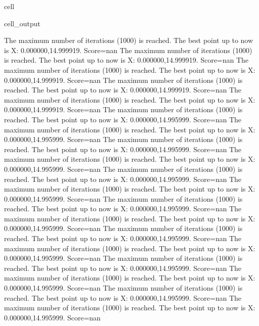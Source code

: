 \documentclass[letterpaper,10pt,english]{jupyterBook}
\begin{document}
\begin{sphinxuseclass}{cell}
\begin{sphinxVerbatimOutput}
\begin{sphinxuseclass}{cell_output}
\begin{sphinxVerbatim}[commandchars=\\\{\}]
The maximum number of iterations (1000) is reached. The best point up to now is X: \PYGZob{}0.000000,14.999919\PYGZcb{}. Score=\PYGZhy{}nan
The maximum number of iterations (1000) is reached. The best point up to now is X: \PYGZob{}0.000000,14.999919\PYGZcb{}. Score=\PYGZhy{}nan
The maximum number of iterations (1000) is reached. The best point up to now is X: \PYGZob{}0.000000,14.999919\PYGZcb{}. Score=\PYGZhy{}nan
The maximum number of iterations (1000) is reached. The best point up to now is X: \PYGZob{}0.000000,14.999919\PYGZcb{}. Score=\PYGZhy{}nan
The maximum number of iterations (1000) is reached. The best point up to now is X: \PYGZob{}0.000000,14.999919\PYGZcb{}. Score=\PYGZhy{}nan
The maximum number of iterations (1000) is reached. The best point up to now is X: \PYGZob{}0.000000,14.995999\PYGZcb{}. Score=\PYGZhy{}nan
The maximum number of iterations (1000) is reached. The best point up to now is X: \PYGZob{}0.000000,14.995999\PYGZcb{}. Score=\PYGZhy{}nan
The maximum number of iterations (1000) is reached. The best point up to now is X: \PYGZob{}0.000000,14.995999\PYGZcb{}. Score=\PYGZhy{}nan
The maximum number of iterations (1000) is reached. The best point up to now is X: \PYGZob{}0.000000,14.995999\PYGZcb{}. Score=\PYGZhy{}nan
The maximum number of iterations (1000) is reached. The best point up to now is X: \PYGZob{}0.000000,14.995999\PYGZcb{}. Score=\PYGZhy{}nan
The maximum number of iterations (1000) is reached. The best point up to now is X: \PYGZob{}0.000000,14.995999\PYGZcb{}. Score=\PYGZhy{}nan
The maximum number of iterations (1000) is reached. The best point up to now is X: \PYGZob{}0.000000,14.995999\PYGZcb{}. Score=\PYGZhy{}nan
The maximum number of iterations (1000) is reached. The best point up to now is X: \PYGZob{}0.000000,14.995999\PYGZcb{}. Score=\PYGZhy{}nan
The maximum number of iterations (1000) is reached. The best point up to now is X: \PYGZob{}0.000000,14.995999\PYGZcb{}. Score=\PYGZhy{}nan
The maximum number of iterations (1000) is reached. The best point up to now is X: \PYGZob{}0.000000,14.995999\PYGZcb{}. Score=\PYGZhy{}nan
The maximum number of iterations (1000) is reached. The best point up to now is X: \PYGZob{}0.000000,14.995999\PYGZcb{}. Score=\PYGZhy{}nan
The maximum number of iterations (1000) is reached. The best point up to now is X: \PYGZob{}0.000000,14.995999\PYGZcb{}. Score=\PYGZhy{}nan
The maximum number of iterations (1000) is reached. The best point up to now is X: \PYGZob{}0.000000,14.995999\PYGZcb{}. Score=\PYGZhy{}nan
The maximum number of iterations (1000) is reached. The best point up to now is X: \PYGZob{}0.000000,14.995999\PYGZcb{}. Score=\PYGZhy{}nan

\end{sphinxVerbatim}
\end{sphinxuseclass}
\end{sphinxVerbatimOutput}
\end{sphinxuseclass}
\end{document}

